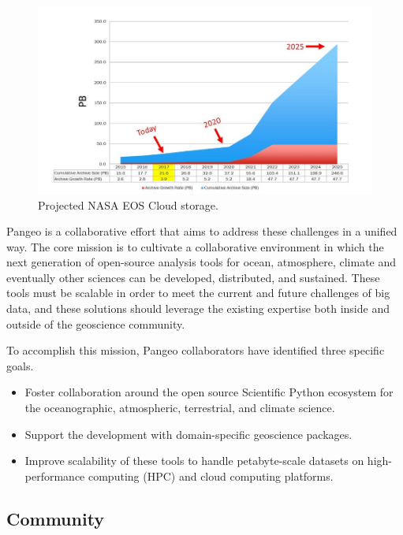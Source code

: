 \documentclass{article}
\begin{document}
\begin{figure}
  \centering
  \includegraphics[width=\columnwidth]{EOSDIS_archive_growth_updated_resize.jpg}
  \caption{\label{nasa_cloud_growth} Projected NASA EOS Cloud storage\cite{b2}.}
\end{figure}


Pangeo is a collaborative effort that aims to address these challenges in a unified way.
The core mission is to cultivate a collaborative environment in which the next generation of open-source analysis tools for ocean, atmosphere, climate and eventually other sciences can be developed, distributed, and sustained. These tools must be scalable in order to meet the current and future challenges of big data, and these solutions should leverage the existing expertise both inside and outside of the geoscience community.

To accomplish this mission, Pangeo collaborators have identified three specific goals.

\begin{itemize}
\item Foster collaboration around the open source Scientific Python ecosystem for the oceanographic, atmospheric, terrestrial, and climate science.
\item Support the development with domain-specific geoscience packages.
\item Improve scalability of these tools to handle petabyte-scale datasets on high-performance computing (HPC) and cloud computing platforms.
\end{itemize}

\subsection{Community}
\label{ssec:community}
\end{document}
